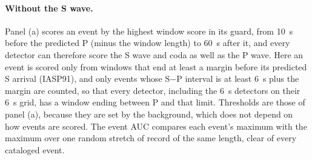 \documentclass[11pt,a4paper]{article}
\begin{document}
\paragraph{Without the S wave.} Panel (a) scores an event by the highest window score in its guard, from 10~s before the predicted P (minus the window length) to 60~s after it, and every detector can therefore score the S wave and coda as well as the P wave. Here an event
is scored only from windows that end at least a margin before its predicted S
arrival (IASP91), and only events whose S$-$P interval is at least 6~s plus the
margin are counted, so that every detector, including the 6~s detectors on their
6~s grid, has a window ending between P and that limit. Thresholds are those of panel (a), because they are set by the background, which does not depend on how events are scored. The event AUC compares each event's maximum with the maximum over one
random stretch of record of the same length, clear of every cataloged event.
\end{document}

